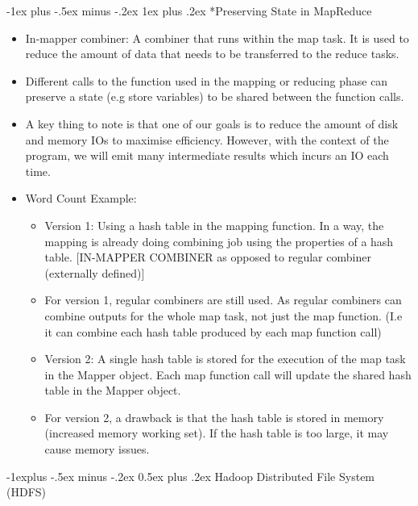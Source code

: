 \documentclass[10pt, landscape]{article}
\makeatletter
\renewcommand{\subsection}{\@startsection{subsection}{2}{0mm}%
  {-1explus -.5ex minus -.2ex}%
  {0.5ex plus .2ex}%
{\normalfont\normalsize\bfseries}}
\renewcommand{\subsubsection}{\@startsection{subsubsection}{3}{0mm}%
  {-1ex plus -.5ex minus -.2ex}%
  {1ex plus .2ex}%
{\normalfont\small\bfseries}}%
\makeatother
\begin{document}
\begin{multicols*}{4}
  \subsubsection*{Preserving State in MapReduce}
  \begin{itemize}
    \item In-mapper combiner: A combiner that runs within the map task. It is used to reduce the amount of data that needs to be transferred to the reduce tasks.
    \item Different calls to the function used in the mapping or reducing phase can preserve a state (e.g store variables) to be shared between the function calls.
    \item A key thing to note is that one of our goals is to reduce the amount of disk and memory IOs to maximise efficiency. However, with the context of the program, we will emit many intermediate results which incurs an IO each time.
    \item Word Count Example:
    \begin{itemize}
      \item Version 1: Using a hash table in the mapping function. In a way, the mapping is already doing combining job using the properties of a hash table. [IN-MAPPER COMBINER as opposed to regular combiner (externally defined)]
      \item For version 1, regular combiners are still used. As regular combiners can combine outputs for the whole map task, not just the map function. (I.e it can combine each hash table produced by each map function call)
      \item Version 2: A single hash table is stored for the execution of the map task in the Mapper object. Each map function call will update the shared hash table in the Mapper object.
      \item For version 2, a drawback is that the hash table is stored in memory (increased memory working set). If the hash table is too large, it may cause memory issues.
    \end{itemize}
  \end{itemize}

  \subsection{Hadoop Distributed File System (HDFS)}


\end{multicols*}
\end{document}
